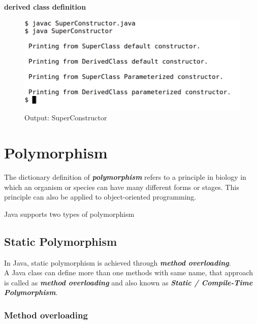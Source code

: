 \documentclass[11pt,a4paper]{article}
\begin{document}
\begin{description}
 
 \textbf{derived class definition}
 
 
 \begin{figure}[H] 
 \begin{center}
   \includegraphics[scale=.4]{SuperConstructor.png}
   \caption*{Output: SuperConstructor}
 \end{center}
 \end{figure}
\end{description}

\section*{Polymorphism}
The dictionary definition of \emph{\textbf{polymorphism}} refers to a principle in biology in which an organism or species can have many different forms or stages. This principle can also be applied to object-oriented programming.
 
 Java supports two types of polymorphism 
 \subsection*{Static Polymorphism} 
 In Java, static polymorphism is achieved through \emph{\textbf{method overloading}}.\\
 A Java class can define more than one methods with same name, that approach is called as \emph{\textbf{method overloading}} and also known as \emph{\textbf{Static / Compile-Time Polymorphism}}.
 
 \subsubsection*{Method overloading}
 
\end{document}
